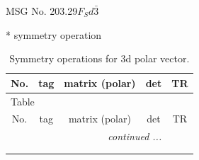 \documentclass[fleqn,8pt]{jsarticle}
\begin{document}
\setcounter{MaxMatrixCols}{32}

\renewcommand{\tablename}{Table~}
\renewcommand{\figurename}{Figure~}
\begin{center}
\LARGE
MSG No. 203.29\quad$F_{S}d\bar{3}$
\end{center}
* symmetry operation
\renewcommand{\arraystretch}{1.3}
\begin{longtable}{ccccc}
\caption{Symmetry operations for 3d polar vector.}
 \\
 \hline \hline
No. & tag & matrix (polar) & det & TR \\ \hline \endfirsthead

\multicolumn{4}{l}{\tablename\ \thetable{}} \\
 \hline \hline
No. & tag & matrix (polar) & det & TR \\ \hline \endhead

 \hline \hline
\multicolumn{4}{r}{\footnotesize\it continued ...} \\ \endfoot

 \hline \hline
\multicolumn{4}{r}{} \\ \endlastfoot


\end{longtable}
\end{document}
